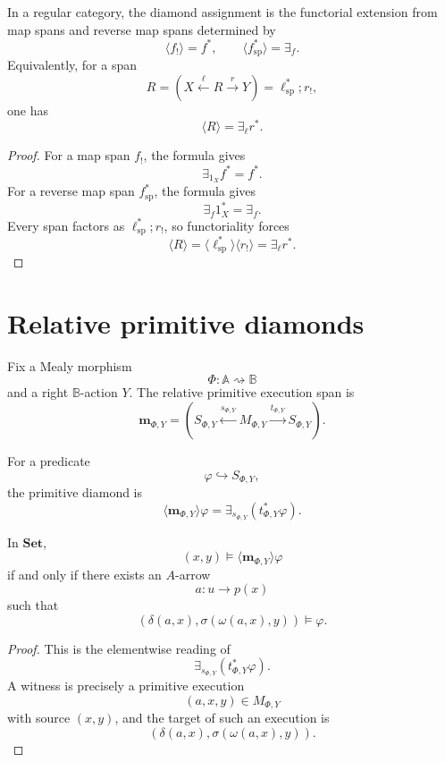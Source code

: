 \begin{theorem}
\label{thm:universal-diamond-relative}
In a regular category, the diamond assignment is the functorial extension from
map spans and reverse map spans determined by
\[
\langle f_!\rangle=f^\ast,
\qquad
\langle f^\ast_{\mathrm{sp}}\rangle=\exists_f.
\]
Equivalently, for a span
\[
R=
\left(
X\xleftarrow{\ell}R\xrightarrow{r}Y
\right)
=
\ell^\ast_{\mathrm{sp}};r_!,
\]
one has
\[
\langle R\rangle=\exists_\ell r^\ast.
\]
\end{theorem}

\begin{proof}
For a map span \(f_!\), the formula gives
\[
\exists_{1_X}f^\ast=f^\ast.
\]
For a reverse map span \(f^\ast_{\mathrm{sp}}\), the formula gives
\[
\exists_f 1_X^\ast=\exists_f.
\]
Every span factors as \(\ell^\ast_{\mathrm{sp}};r_!\), so functoriality forces
\[
\langle R\rangle
=
\langle \ell^\ast_{\mathrm{sp}}\rangle\langle r_!\rangle
=
\exists_\ell r^\ast.
\]
\end{proof}

\section{Relative primitive diamonds}
\label{sec:relative-primitive-diamonds}

Fix a Mealy morphism
\[
\Phi:\mathbb A\rightsquigarrow\mathbb B
\]
and a right \(\mathbb B\)-action \(Y\). The relative primitive execution span is
\[
\mathbf m_{\Phi,Y}
=
\left(
S_{\Phi,Y}
\xleftarrow{s_{\Phi,Y}}
M_{\Phi,Y}
\xrightarrow{t_{\Phi,Y}}
S_{\Phi,Y}
\right).
\]

For a predicate
\[
\varphi\hookrightarrow S_{\Phi,Y},
\]
the primitive diamond is
\[
\langle \mathbf m_{\Phi,Y}\rangle\varphi
=
\exists_{s_{\Phi,Y}}(t_{\Phi,Y}^\ast\varphi).
\]

\begin{proposition}
\label{prop:external-reading-relative-primitive-diamonds}
In \(\mathbf{Set}\),
\[
(x,y)\models \langle \mathbf m_{\Phi,Y}\rangle\varphi
\]
if and only if there exists an \(A\)-arrow
\[
a:u\to p(x)
\]
such that
\[
\left(
\delta(a,x),
\sigma(\omega(a,x),y)
\right)
\models\varphi.
\]
\end{proposition}

\begin{proof}
This is the elementwise reading of
\[
\exists_{s_{\Phi,Y}}(t_{\Phi,Y}^\ast\varphi).
\]
A witness is precisely a primitive execution
\[
(a,x,y)\in M_{\Phi,Y}
\]
with source \((x,y)\), and the target of such an execution is
\[
\left(
\delta(a,x),
\sigma(\omega(a,x),y)
\right).
\]
\end{proof}

